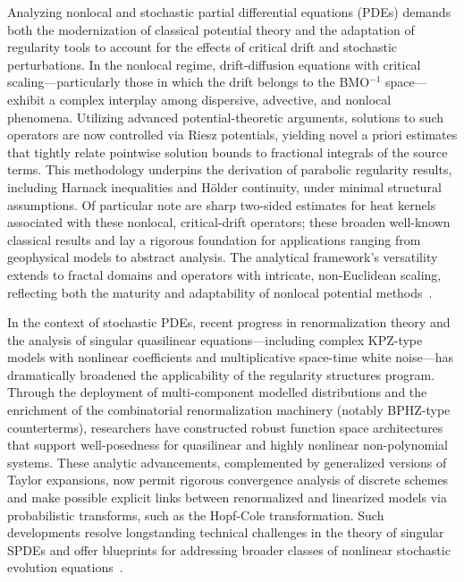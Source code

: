 \documentclass[11pt]{article}
\begin{document}
Analyzing nonlocal and stochastic partial differential equations (PDEs) demands both the modernization of classical potential theory and the adaptation of regularity tools to account for the effects of critical drift and stochastic perturbations. In the nonlocal regime, drift-diffusion equations with critical scaling—particularly those in which the drift belongs to the BMO$^{-1}$ space—exhibit a complex interplay among dispersive, advective, and nonlocal phenomena. Utilizing advanced potential-theoretic arguments, solutions to such operators are now controlled via Riesz potentials, yielding novel a priori estimates that tightly relate pointwise solution bounds to fractional integrals of the source terms. This methodology underpins the derivation of parabolic regularity results, including Harnack inequalities and Hölder continuity, under minimal structural assumptions. Of particular note are sharp two-sided estimates for heat kernels associated with these nonlocal, critical-drift operators; these broaden well-known classical results and lay a rigorous foundation for applications ranging from geophysical models to abstract analysis. The analytical framework's versatility extends to fractal domains and operators with intricate, non-Euclidean scaling, reflecting both the maturity and adaptability of nonlocal potential methods~\cite{ref95}.

In the context of stochastic PDEs, recent progress in renormalization theory and the analysis of singular quasilinear equations—including complex KPZ-type models with nonlinear coefficients and multiplicative space-time white noise—has dramatically broadened the applicability of the regularity structures program. Through the deployment of multi-component modelled distributions and the enrichment of the combinatorial renormalization machinery (notably BPHZ-type counterterms), researchers have constructed robust function space architectures that support well-posedness for quasilinear and highly nonlinear non-polynomial systems. These analytic advancements, complemented by generalized versions of Taylor expansions, now permit rigorous convergence analysis of discrete schemes and make possible explicit links between renormalized and linearized models via probabilistic transforms, such as the Hopf-Cole transformation. Such developments resolve longstanding technical challenges in the theory of singular SPDEs and offer blueprints for addressing broader classes of nonlinear stochastic evolution equations~\cite{ref94}.
\end{document}
